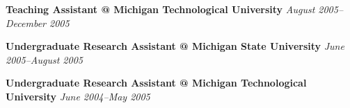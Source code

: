 \documentclass[12pt]{article}
\makeatletter
\newcommand{\jobitem}[4]{
    \vspace{5pt}

    \textbf{#1 @ #2} \hfill \textit{#3} %

    \vspace{-5pt}
}
\makeatother
\begin{document}
\jobitem{Teaching Assistant}{Michigan Technological University}{August 2005--December 2005}{Houghton, MI}
\vspace{10pt}

%


\jobitem{Undergraduate Research Assistant}{Michigan State University}{June 2005--August 2005}{East Lansing, MI}
\vspace{10pt}


\jobitem{Undergraduate Research Assistant}{Michigan Technological University}{June 2004--May 2005}{Houghton, MI}

\end{document}
